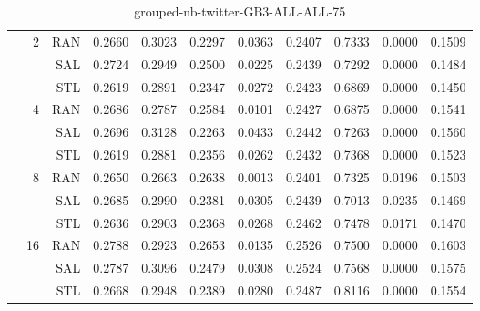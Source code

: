 \begin{center}
\begin{table}[htbp]
\begin{center}
\begin{tabular}{ | r | r | r | r | r | r | r | r | r | r | r |}
 & \multirow{3}{*}{2} & RAN & 0.2660 & 0.3023 & 0.2297 & 0.0363 & 0.2407 & 0.7333 & 0.0000 & 0.1509\\ \cline{3-11}
 &   & SAL & 0.2724 & 0.2949 & 0.2500 & 0.0225 & 0.2439 & 0.7292 & 0.0000 & 0.1484\\ \cline{3-11}
 &   & STL & 0.2619 & 0.2891 & 0.2347 & 0.0272 & 0.2423 & 0.6869 & 0.0000 & 0.1450\\ \cline{2-11}
 & \multirow{3}{*}{4} & RAN & 0.2686 & 0.2787 & 0.2584 & 0.0101 & 0.2427 & 0.6875 & 0.0000 & 0.1541\\ \cline{3-11}
 &   & SAL & 0.2696 & 0.3128 & 0.2263 & 0.0433 & 0.2442 & 0.7263 & 0.0000 & 0.1560\\ \cline{3-11}
 &   & STL & 0.2619 & 0.2881 & 0.2356 & 0.0262 & 0.2432 & 0.7368 & 0.0000 & 0.1523\\ \cline{2-11}
 & \multirow{3}{*}{8} & RAN & 0.2650 & 0.2663 & 0.2638 & 0.0013 & 0.2401 & 0.7325 & 0.0196 & 0.1503\\ \cline{3-11}
 &   & SAL & 0.2685 & 0.2990 & 0.2381 & 0.0305 & 0.2439 & 0.7013 & 0.0235 & 0.1469\\ \cline{3-11}
 &   & STL & 0.2636 & 0.2903 & 0.2368 & 0.0268 & 0.2462 & 0.7478 & 0.0171 & 0.1470\\ \cline{2-11}
 & \multirow{3}{*}{16} & RAN & 0.2788 & 0.2923 & 0.2653 & 0.0135 & 0.2526 & 0.7500 & 0.0000 & 0.1603\\ \cline{3-11}
 &   & SAL & 0.2787 & 0.3096 & 0.2479 & 0.0308 & 0.2524 & 0.7568 & 0.0000 & 0.1575\\ \cline{3-11}
 &   & STL & 0.2668 & 0.2948 & 0.2389 & 0.0280 & 0.2487 & 0.8116 & 0.0000 & 0.1554\\ \cline{2-11}
\hline
\end{tabular}
\caption{grouped-nb-twitter-GB3-ALL-ALL-75}
\end{center}
 \end{table}
\end{center}


